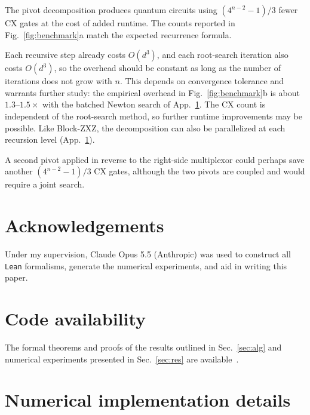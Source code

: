 \documentclass[11pt]{article}
\begin{document}
The pivot decomposition produces quantum circuits using $(4^{n-2}-1)/3$ fewer CX gates at the cost of added runtime. The counts reported in Fig.~\ref{fig:benchmark}a match the expected recurrence formula.

Each recursive step already costs $O(d^3)$, and each root-search iteration also costs $O(d^3)$, so the overhead should be constant as long as the number of iterations does not grow with $n$. This depends on convergence tolerance and warrants further study: the empirical overhead in Fig.~\ref{fig:benchmark}b is about $1.3$--$1.5\times$ with the batched Newton search of App.~\ref{app:par}. The CX count is independent of the root-search method, so further runtime improvements may be possible. Like Block-ZXZ, the decomposition can also be parallelized at each recursion level (App.~\ref{app:par}).

A second pivot applied in reverse to the right-side multiplexor could perhaps save another
$(4^{n-2}-1)/3$ CX gates, although the two pivots are coupled and would require a joint search.

\section*{Acknowledgements}

Under my supervision, Claude Opus 5.5 (Anthropic) was used to construct all \texttt{Lean} formalisms, generate the numerical experiments, and aid in writing this paper.

\section*{Code availability}

The formal theorems and proofs of the results outlined in Sec.~\ref{sec:alg} and numerical experiments presented in Sec.~\ref{sec:res}
are available~\cite{code}.

\appendix
\section{Numerical implementation details}\label{app:par}
\end{document}
